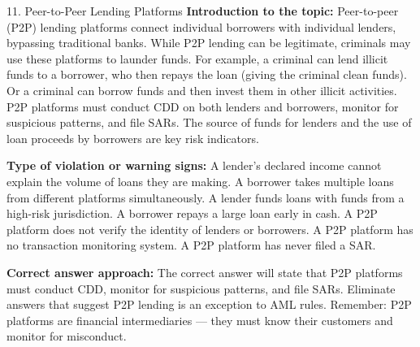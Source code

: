 \documentclass[11pt,a4paper]{beamer}
\begin{document}
\begin{frame}{11. Peer-to-Peer Lending Platforms}
\tiny
\noindent\textbf{Introduction to the topic:} Peer-to-peer (P2P) lending platforms connect individual borrowers with individual lenders, bypassing traditional banks. While P2P lending can be legitimate, criminals may use these platforms to launder funds. For example, a criminal can lend illicit funds to a borrower, who then repays the loan (giving the criminal clean funds). Or a criminal can borrow funds and then invest them in other illicit activities. P2P platforms must conduct CDD on both lenders and borrowers, monitor for suspicious patterns, and file SARs. The source of funds for lenders and the use of loan proceeds by borrowers are key risk indicators.

\vspace{0.1cm}
\noindent\textbf{Type of violation or warning signs:} A lender's declared income cannot explain the volume of loans they are making. A borrower takes multiple loans from different platforms simultaneously. A lender funds loans with funds from a high-risk jurisdiction. A borrower repays a large loan early in cash. A P2P platform does not verify the identity of lenders or borrowers. A P2P platform has no transaction monitoring system. A P2P platform has never filed a SAR.

\vspace{0.1cm}
\noindent\textbf{Correct answer approach:} The correct answer will state that P2P platforms must conduct CDD, monitor for suspicious patterns, and file SARs. Eliminate answers that suggest P2P lending is an exception to AML rules. Remember: P2P platforms are financial intermediaries — they must know their customers and monitor for misconduct.
\end{frame}
\end{document}
